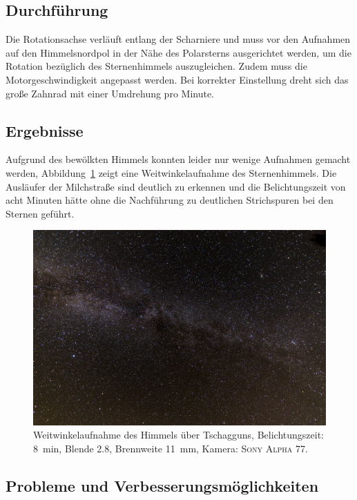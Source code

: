 \documentclass[
  bibliography=totoc,     %
  captions=tableheading,  %
  titlepage=firstiscover, %
  twocolumn,
]{scrartcl}
\begin{document}
\subsection{Durchführung}
Die Rotationsachse verläuft entlang der Scharniere und muss vor den Aufnahmen auf den Himmelsnordpol in der Nähe des Polarsterns ausgerichtet werden, um die Rotation bezüglich des Sternenhimmels auszugleichen.
Zudem muss die Motorgeschwindigkeit angepasst werden.
Bei korrekter Einstellung dreht sich das große Zahnrad mit einer Umdrehung pro Minute.

\subsection{Ergebnisse}
Aufgrund des bewölkten Himmels konnten leider nur wenige Aufnahmen gemacht werden, Abbildung~\ref{fig:milkyway} zeigt eine Weitwinkelaufnahme des Sternenhimmels. 
Die Ausläufer der Milchstraße sind deutlich zu erkennen und die Belichtungszeit von acht Minuten hätte ohne die Nachführung zu deutlichen Strichspuren bei den Sternen geführt.
\begin{figure}
  \centering
  \includegraphics[width=\linewidth]{images/milkyway.jpg}
  \caption{Weitwinkelaufnahme des Himmels über Tschagguns, Belichtungszeit: \SI{8}{\minute}, Blende \num{2.8}, Brennweite \SI{11}{\milli\metre}, Kamera: \textsc{Sony Alpha 77}.}
  \label{fig:milkyway}
\end{figure}

\subsection{Probleme und Verbesserungsmöglichkeiten}
\end{document}
